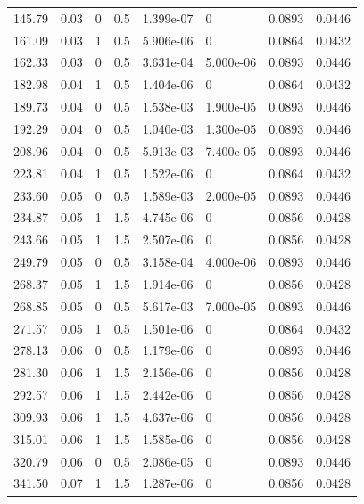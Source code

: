 \documentclass[preview]{standalone}
\begin{document}
{{\begin{tabular}{L{1.2cm}C{1.2cm} C{0.3cm}C{0.5cm} C{1.4cm}C{1.4cm} C{1.4cm}C{1.4cm}}
  145.79  &  0.03  & 0     & 0.5 &  1.399e-07  & 0  & 0.0893 &  0.0446   \\ 
  161.09  &  0.03  & 1     & 0.5 &  5.906e-06  & 0  & 0.0864 &  0.0432   \\ 
  162.33  &  0.03  & 0     & 0.5 &  3.631e-04  & 5.000e-06  & 0.0893 &  0.0446   \\ 
  182.98  &  0.04  & 1     & 0.5 &  1.404e-06  & 0  & 0.0864 &  0.0432   \\ 
  189.73  &  0.04  & 0     & 0.5 &  1.538e-03  & 1.900e-05  & 0.0893 &  0.0446   \\ 
  192.29  &  0.04  & 0     & 0.5 &  1.040e-03  & 1.300e-05  & 0.0893 &  0.0446   \\ 
  208.96  &  0.04  & 0     & 0.5 &  5.913e-03  & 7.400e-05  & 0.0893 &  0.0446   \\ 
  223.81  &  0.04  & 1     & 0.5 &  1.522e-06  & 0  & 0.0864 &  0.0432   \\ 
  233.60  &  0.05  & 0     & 0.5 &  1.589e-03  & 2.000e-05  & 0.0893 &  0.0446   \\ 
  234.87  &  0.05  & 1     & 1.5 &  4.745e-06  & 0  & 0.0856 &  0.0428   \\ 
  243.66  &  0.05  & 1     & 1.5 &  2.507e-06  & 0  & 0.0856 &  0.0428   \\ 
  249.79  &  0.05  & 0     & 0.5 &  3.158e-04  & 4.000e-06  & 0.0893 &  0.0446   \\ 
  268.37  &  0.05  & 1     & 1.5 &  1.914e-06  & 0  & 0.0856 &  0.0428   \\ 
  268.85  &  0.05  & 0     & 0.5 &  5.617e-03  & 7.000e-05  & 0.0893 &  0.0446   \\ 
  271.57  &  0.05  & 1     & 0.5 &  1.501e-06  & 0  & 0.0864 &  0.0432   \\ 
  278.13  &  0.06  & 0     & 0.5 &  1.179e-06  & 0  & 0.0893 &  0.0446   \\ 
  281.30  &  0.06  & 1     & 1.5 &  2.156e-06  & 0  & 0.0856 &  0.0428   \\ 
  292.57  &  0.06  & 1     & 1.5 &  2.442e-06  & 0  & 0.0856 &  0.0428   \\ 
  309.93  &  0.06  & 1     & 1.5 &  4.637e-06  & 0  & 0.0856 &  0.0428   \\ 
  315.01  &  0.06  & 1     & 1.5 &  1.585e-06  & 0  & 0.0856 &  0.0428   \\ 
  320.79  &  0.06  & 0     & 0.5 &  2.086e-05  & 0  & 0.0893 &  0.0446   \\ 
  341.50  &  0.07  & 1     & 1.5 &  1.287e-06  & 0  & 0.0856 &  0.0428   \\ 

\end{tabular}}}
\end{document}
